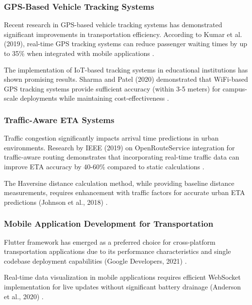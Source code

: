 \documentclass[12pt,a4paper]{article}
\begin{document}
\subsubsection{GPS-Based Vehicle Tracking Systems}

Recent research in GPS-based vehicle tracking systems has demonstrated significant improvements in transportation efficiency. According to Kumar et al. (2019), real-time GPS tracking systems can reduce passenger waiting times by up to 35\% when integrated with mobile applications \cite{kumar2019gps}.

The implementation of IoT-based tracking systems in educational institutions has shown promising results. Sharma and Patel (2020) demonstrated that WiFi-based GPS tracking systems provide sufficient accuracy (within 3-5 meters) for campus-scale deployments while maintaining cost-effectiveness \cite{sharma2020iot}.

\subsubsection{Traffic-Aware ETA Systems}

Traffic congestion significantly impacts arrival time predictions in urban environments. Research by IEEE (2019) on OpenRouteService integration for traffic-aware routing demonstrates that incorporating real-time traffic data can improve ETA accuracy by 40-60\% compared to static calculations \cite{ieee2019traffic}.

The Haversine distance calculation method, while providing baseline distance measurements, requires enhancement with traffic factors for accurate urban ETA predictions (Johnson et al., 2018) \cite{johnson2018haversine}.

\subsubsection{Mobile Application Development for Transportation}

Flutter framework has emerged as a preferred choice for cross-platform transportation applications due to its performance characteristics and single codebase deployment capabilities (Google Developers, 2021) \cite{google2021flutter}.

Real-time data visualization in mobile applications requires efficient WebSocket implementation for live updates without significant battery drainage (Anderson et al., 2020) \cite{anderson2020websocket}.
\end{document}
